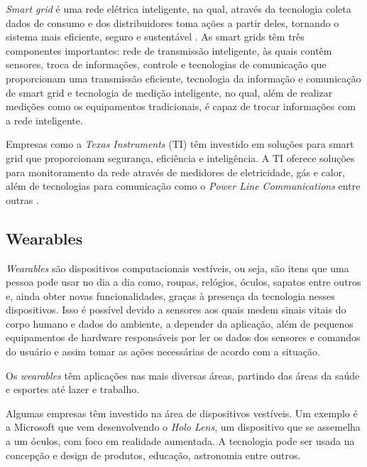 \textit{Smart grid} é uma rede elétrica inteligente, na qual, através da tecnologia coleta dados de 
consumo e dos distribuidores toma ações a partir deles, tornando o sistema mais eficiente, seguro 
e sustentável \cite{CECILIA2016}. As smart grids têm três componentes importantes: rede de 
transmissão inteligente, às quais contêm sensores, troca de informações, controle e tecnologias de 
comunicação que proporcionam uma transmissão eficiente, tecnologia da informação e comunicação de 
smart grid  e tecnologia de medição inteligente, no qual, além de realizar medições como os 
equipamentos tradicionais, é capaz de trocar informações com a rede inteligente. 

Empresas como a \textit{Texas Instruments} (TI) têm investido em soluções para smart grid que 
proporcionam segurança, eficiência e inteligência. A TI oferece soluções para monitoramento da rede 
através de medidores de eletricidade, gás e calor, além de tecnologias para comunicação como o 
\textit{Power Line Communications} entre outras \cite{texasinstruments2017}.


\subsection{Wearables}

\textit{Wearables} são dispositivos computacionais vestíveis, ou seja, são itens que uma pessoa pode usar no dia a dia como, roupas, relógios, óculos, sapatos entre outros e, ainda obter novas funcionalidades, graças à presença da tecnologia nesses dispositivos. Isso é possível devido a sensores aos quais medem sinais vitais do corpo humano e dados do ambiente, a depender da aplicação, além de pequenos equipamentos de hardware responsáveis por ler os dados dos sensores e comandos do usuário e assim tomar as ações necessárias de acordo com a situação.

Os \textit{wearables} têm aplicações nas mais diversas áreas, partindo das áreas da saúde e esportes até lazer e trabalho. 

Algumas empresas têm investido na área de dispositivos vestíveis. Um exemplo é a Microsoft que vem desenvolvendo o \textit{Holo Lens}, um dispositivo que se assemelha a um óculos, com foco em realidade aumentada. A tecnologia pode ser usada na concepção e design de produtos, educação, astronomia entre outros.


